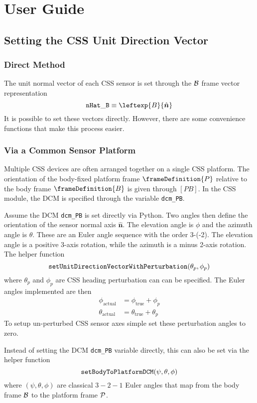 \section{User Guide}

\subsection{Setting the CSS Unit Direction Vector}
\subsubsection{Direct Method}
The unit normal vector of each CSS sensor is set through the $\cal B$ frame vector representation
\begin{equation}
		{\tt nHat\_B} \equiv \leftexp{B}{\hat{\bm n}}
\end{equation}
It is possible to set these vectors directly.  However, there are some convenience functions that make this process easier.  

\subsubsection{Via a Common Sensor Platform}
Multiple CSS devices are often arranged together on a single CSS platform.  The orientation of the body-fixed platform frame $\frameDefinition{P}$ relative to the body frame $\frameDefinition{B}$ is given through $[PB]$.  In the CSS module, the DCM is specified through the variable {\tt dcm\_PB}.

Assume the DCM  {\tt dcm\_PB} is set directly via Python.  Two angles then define the orientation of the sensor normal axis $\hat{\bm n}$.  The elevation angle is $\phi$ and the azimuth angle is $\theta$.  These are an Euler angle sequence with the order 3-(-2).  The elevation angle is a positive 3-axis rotation, while the azimuth is a minus 2-axis rotation.  The helper function
$$
{\tt setUnitDirectionVectorWithPerturbation}(\theta_{p}, \phi_{p}) 
$$
where $\theta_{p}$ and $\phi_{p}$ are CSS heading perturbation can can be specified.  The Euler angles implemented are then
\begin{align}
		\phi_{\text{actual}} &= \phi_{\text{true}} + \phi_{p} \\
		\theta_{\text{actual}} &= \theta_{\text{true}} + \theta_{p} 
\end{align}
To setup un-perturbed CSS sensor axes simple set these perturbation angles to zero.  

Instead of setting the DCM {\tt dcm\_PB} variable directly, this can also be set via the helper function
$$
	{\tt setBodyToPlatformDCM}(\psi, \theta, \phi)
$$
where $(\psi, \theta, \phi)$ are classical $3-2-1$ Euler angles that map from the body frame $\cal B$ to the platform frame $\cal P$.  




